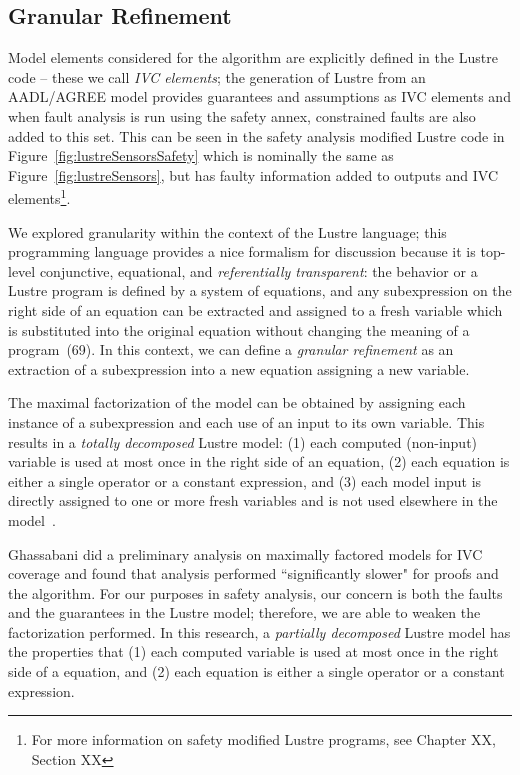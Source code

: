 \subsection{Granular Refinement}
\label{sec:granularityFRESHAlg}
Model elements considered for the \aivcalg algorithm are explicitly defined in the Lustre code -- these we call \emph{IVC elements}; the generation of Lustre from an AADL/AGREE model provides guarantees and assumptions as IVC elements and when fault analysis is run using the safety annex, constrained faults are also added to this set. This can be seen in the safety analysis modified Lustre code in Figure~\ref{fig:lustreSensorsSafety} which is nominally the same as Figure~\ref{fig:lustreSensors}, but has faulty information added to outputs and IVC elements\footnote{For more information on safety modified Lustre programs, see Chapter XX, Section XX }. 


 We explored granularity within the context of the Lustre language; this programming language provides a nice formalism for discussion because it is top-level conjunctive, equational, and \emph{referentially transparent}: the behavior or a Lustre program is defined by a system of equations, and any subexpression on the right side of an equation can be extracted and assigned to a fresh variable which is substituted into the original equation without changing the meaning of a program~\cite{}(69). In this context, we can define a \emph{granular refinement} as an extraction of a subexpression into a new equation assigning a new variable. 

The maximal factorization of the model can be obtained by assigning each instance of a subexpression and each use of an input to its own variable. This results in a \emph{totally decomposed} Lustre model: (1) each computed (non-input) variable is used at most once in the right side of an equation, (2) each equation is either a single operator or a constant expression, and (3) each model input is directly assigned to one or more fresh variables and is not used elsewhere in the model~\cite{ghassabani_2018}.

Ghassabani did a preliminary analysis on maximally factored models for IVC coverage and found that analysis performed ``significantly slower" for proofs and the \ivcmust algorithm. For our purposes in safety analysis, our concern is both the faults and the guarantees in the Lustre model; therefore, we are able to weaken the factorization performed. In this research, a \emph{partially decomposed} Lustre model has the properties that (1) each computed variable is used at most once in the right side of a equation, and (2) each equation is either a single operator or a constant expression. 

